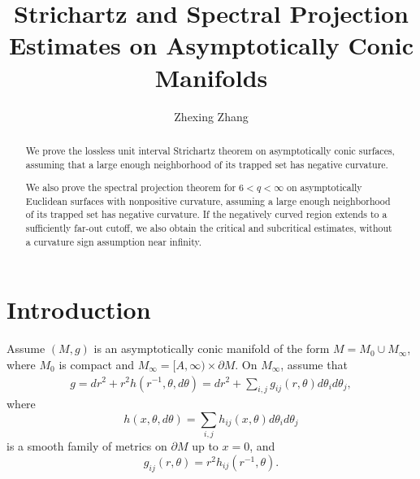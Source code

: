 \documentclass[11pt]{amsart}
\begin{document}
\title{Strichartz and Spectral Projection Estimates on Asymptotically Conic Manifolds}
\author{Zhexing Zhang}
\date{}


\begin{abstract}
 We prove the lossless unit interval Strichartz theorem on asymptotically conic surfaces, assuming that a large enough neighborhood of its trapped set has negative curvature. 
 
 We also prove the spectral projection theorem for $6<q<\infty$ on asymptotically Euclidean surfaces with nonpositive curvature, assuming a large enough neighborhood of its trapped set has negative curvature. If the negatively curved region extends to a sufficiently far-out cutoff, we also obtain the critical and subcritical estimates, without a curvature sign assumption near infinity.
\end{abstract}
\maketitle
\section{Introduction}
Assume $(M,g)$ is an asymptotically conic manifold of the form
$M=M_0\cup M_\infty$, where $M_0$ is compact and
$M_\infty=[A,\infty)\times\partial M$. On $M_\infty$, assume that
\begin{align}\label{eq:acmetric}
g
=
dr^2+r^2h(r^{-1},\theta,d\theta)
=
dr^2+\sum_{i,j}g_{ij}(r,\theta)d\theta_i d\theta_j,
\end{align}
where
\[
h(x,\theta,d\theta)
=
\sum_{i,j}h_{ij}(x,\theta)d\theta_i d\theta_j
\]
is a smooth family of metrics on $\partial M$ up to $x=0$, and
\[
g_{ij}(r,\theta)=r^2h_{ij}(r^{-1},\theta).
\]
\end{document}
